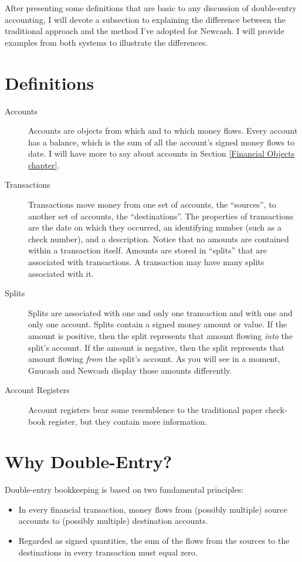 \documentclass{report}
\begin{document}
After presenting some definitions that are basic to any discussion of double-entry accounting, I will devote a subsection to explaining the difference between the traditional approach and the method I've adopted for Newcash. I will provide examples from both systems to illustrate the differences.
\section{Definitions}
\begin{description}
\item [Accounts] Accounts are objects from which and to which money flows. Every account has a balance, which is the sum of all the account's signed money flows to date. I will have more to say about accounts in Section \ref{Financial Objects chapter}.
\item [Transactions] Transactions move money from one set of accounts, the ``sources'',  to another set of accounts, the ``destinations''. The properties of transactions are the date on which they occurred, an identifying number (such as a check number), and a description. Notice that no amounts are contained within a transaction itself. Amounts are stored in ``splits'' that are associated with transactions. A transaction may have many splits associated with it.
\item [Splits] Splits are associated with one and only one transaction and with one and only one account. Splits contain a signed money amount or value. If the amount is positive, then the split represents that amount flowing \emph{into} the split's account. If the amount is negative, then  the split represents that amount flowing \emph{from} the split's account. As you will see in a moment, Gnucash and Newcash display those amounts differently. 
\item[Account Registers] Account registers bear some resemblence to the traditional paper check-book register, but they contain more information.
\end{description}
\section{Why Double-Entry?}
\label{Why Double-Entry?}

Double-entry bookkeeping is based on two fundamental principles:
\begin{itemize}
\item In every financial transaction,  money flows from (possibly multiple) source accounts to (possibly multiple) destination accounts. 
\item Regarded as signed quantities, the sum of the flows from the sources to the destinations in every transaction must equal zero.
\end{itemize}
\end{document}
